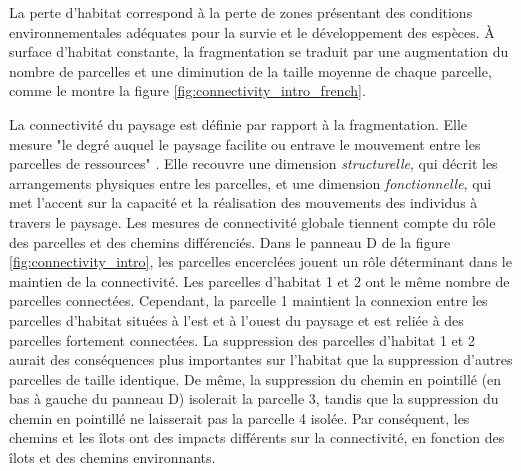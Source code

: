 \clearpage
\begin{tcolorbox}[breakable, 
colback =verylightgray, 
colframe=gray!75!black,
title={Encadré 2 - Habitat : perte, fragmentation et connectivité},
fontupper=\small]
\par 
\justifying

La perte d'habitat correspond à la perte de zones présentant des conditions environnementales adéquates pour la survie et le développement des espèces. À surface d'habitat constante, la fragmentation se traduit par une augmentation du nombre de parcelles et une diminution de la taille moyenne de chaque parcelle, comme le montre la figure \ref{fig:connectivity_intro_french}. 

La connectivité du paysage est définie par rapport à la fragmentation. Elle mesure "le degré auquel le paysage facilite ou entrave le mouvement entre les parcelles de ressources" \citep{taylor_connectivity_1993}. 
Elle recouvre une dimension \textit{structurelle}, qui décrit les arrangements physiques entre les parcelles, et une dimension \textit{fonctionnelle}, qui met l'accent sur la capacité et la réalisation des mouvements des individus à travers le paysage. Les mesures de connectivité globale tiennent compte du rôle des parcelles et des chemins différenciés. Dans le panneau D de la figure \ref{fig:connectivity_intro}, les parcelles encerclées jouent un rôle déterminant dans le maintien de la connectivité. Les parcelles d'habitat 1 et 2 ont le même nombre de parcelles connectées. Cependant, la parcelle 1 maintient la connexion entre les parcelles d'habitat situées à l'est et à l'ouest du paysage et est reliée à des parcelles fortement connectées. La suppression des parcelles d'habitat 1 et 2 aurait des conséquences plus importantes sur l'habitat que la suppression d'autres parcelles de taille identique. De même, la suppression du chemin en pointillé (en bas à gauche du panneau D) isolerait la parcelle 3, tandis que la suppression du chemin en pointillé ne laisserait pas la parcelle 4 isolée. Par conséquent, les chemins et les îlots ont des impacts différents sur la connectivité, en fonction des îlots et des chemins environnants.


\end{tcolorbox}
